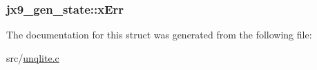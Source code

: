 \hypertarget{structjx9__gen__state_a2f394b42a157573d16ec18014cd2eb46}{
\subsubsection[{x\-Err}]{ jx9\-\_\-gen\-\_\-state\-::x\-Err}}\label{d6/de9/structjx9__gen__state_a2f394b42a157573d16ec18014cd2eb46}


The documentation for this struct was generated from the following file\-:\begin{DoxyCompactItemize}
\item 
src/\hyperlink{unqlite_8c}{unqlite.\-c}\end{DoxyCompactItemize}
